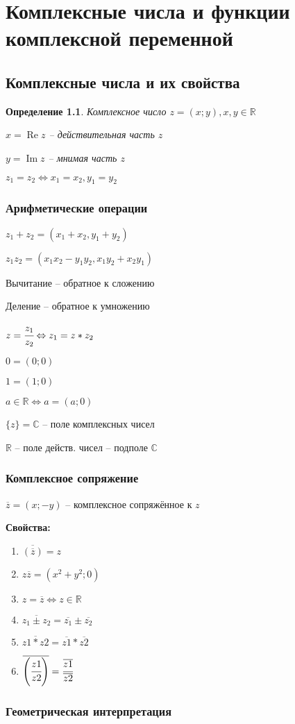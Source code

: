 \documentclass[draft]{report}
\newcommand{\R}{\mathbb{R}}
\renewcommand{\C}{\mathbb{C}}
\newcommand{\LRA}{\Leftrightarrow}
\renewcommand{\bar}{\overline}
\renewcommand{\Im}{\mathop{\mathrm{Im}}\nolimits}
\renewcommand{\Re}{\mathop{\mathrm{Re}}\nolimits}
\newcommand{\opr}[1]{\begin{opred}#1\end{opred}}
\newtheorem*{opred}{Определение}
\theoremstyle{remark}
\begin{document}
\tableofcontents
\chapter{Комплексные числа и функции комплексной переменной}
\section{Комплексные числа и их свойства}
\opr{Комплексное число $z=(x;y), x,y\in\R$

$x=\Re z$ -- действительная часть $z$

$y=\Im z$ -- мнимая часть $z$}

$z_1=z_2 \LRA x_1=x_2, y_1=y_2$
\subsection{Арифметические операции}
$z_1+z_2=(x_1+x_2,y_1+y_2)$

$z_1z_2=(x_1x_2-y_1y_2,x_1y_2+x_2y_1)$

Вычитание -- обратное к сложению

Деление -- обратное к умножению

$z=\cfrac{z_1}{z_2} \LRA z_1=z*z_2$

$0=(0;0)$

$1=(1;0)$

$a\in\R\LRA a=(a;0)$

$\{z\}=\C$ -- поле комплексных чисел

$\R$ -- поле действ. чисел -- подполе $\C$
\subsection{Комплексное сопряжение}

$\bar{z}=(x;-y)$ -- комплексное сопряжённое к $z$

{\bfseries Свойства:}
\begin{enumerate}
\item$\bar{\left(\bar{z}\right)}=z$
\item$z\bar{z}=(x^2+y^2;0)$
\item$z=\bar{z}\LRA z\in\R$
\item$\bar{z_1\pm z_2}=\bar{z_1}\pm\bar{z_2}$
\item$\bar{z1*z2}=\bar{z1}*\bar{z2}$
\item$\bar{\left(\cfrac{z1}{z2}\right)}=\cfrac{\bar{z1}}{\bar{z2}}$
\end{enumerate}
\subsection{Геометрическая интерпретация}
\end{document}
